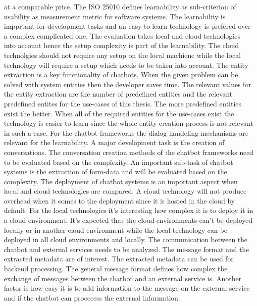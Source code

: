 at a comparable price.
The ISO 25010\cite{iso25010} defines learnability as sub-criterion of usability as measurement
metric for software systems.
The learnability is impprtant for development tasks and an easy to learn 
technology is prefered over a complex complicated one.
The evaluation takes local and cloud technologies into account hence the 
setup complexity is part of the learnability.
The cloud technolgies should not require any setup on the local machiene while 
the local technology will require a setup which needs to be taken into account.
The entity extraction is a key functionality of chatbots.
When the given problem can be solved with system entities then the developer
saves time.
The relevant values for the entity extraction are the number of predefined entities and 
the relevant predefined entites for the use-cases of this thesis.
The more predefined entities exist the better.
When all of the required entities for the use-cases exist the 
technology is easier to learn since the whole entity creation process is not 
relevant in such a case.
For the chatbot frameworks the dialog handeling mechanisms are relevant for the learnability.
A major development task is the creation of conversations.
The conversation creation methods of the chatbot frameworks need to be evaluated based on the 
complexity.
An important sub-task of chatbot systems is the extraction of form-data and will be evaluated based 
on the complexity.
The deployment of chatbot systems is an important aspect when local and cloud technologies are 
compared.
A cloud technology will not produce overhead when it comes to the deployment since it is 
hosted in the cloud by default.
For the local technologies it's interesting how complex it is to deploy it in a cloud 
environment.
It's expected that the cloud environments can't be deployed locally or in another cloud 
environment while the local technology can be deployed in all cloud environments and locally.
The communication between the chatbot and external services needs to be analyzed.
The message format and the extracted metadata are of interest.
The extracted metadata can be used for backend processing.
The general message format defines how complex the exchange of messages between the 
chatbot and an external service is.
Another factor is how easy it is to add information to the message on the 
external service and if the chatbot can procecess the external information.



